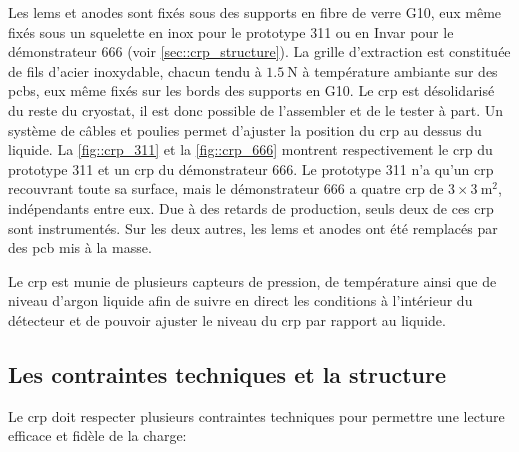             Les \glspl{lem} et anodes sont fixés sous des supports en fibre de verre G10, eux même fixés sous un squelette en inox pour le prototype 311 ou en Invar pour le démonstrateur 666 (voir \autoref{sec::crp_structure}). La grille d'extraction est constituée de fils d'acier inoxydable, chacun tendu à $\SI{1.5}{\newton}$ à température ambiante sur des \glspl{pcb}, eux même fixés sur les bords des supports en G10. Le \gls{crp} est désolidarisé du reste du cryostat, il est donc possible de l'assembler et de le tester à part. Un système de câbles et poulies permet d'ajuster la position du \gls{crp} au dessus du liquide. La \autoref{fig::crp_311} et la \autoref{fig::crp_666} montrent respectivement le \gls{crp} du prototype 311 et un \gls{crp} du démonstrateur 666. Le prototype 311 n'a qu'un \gls{crp} recouvrant toute sa surface, mais le démonstrateur 666 a quatre \gls{crp} de $3\times\SI{3}{\meter\squared}$, indépendants entre eux. Due à des retards de production, seuls deux de ces \gls{crp} sont instrumentés. Sur les deux autres, les \glspl{lem} et anodes ont été remplacés par des \gls{pcb} mis à la masse.
            
            Le \gls{crp} est munie de plusieurs capteurs de pression, de température ainsi que de niveau d'argon liquide afin de suivre en direct les conditions à l'intérieur du détecteur et de pouvoir ajuster le niveau du \gls{crp} par rapport au liquide.
        
        \subsection{Les contraintes techniques et la structure}\label{sec::crp_structure}
            
            Le \gls{crp} doit respecter plusieurs contraintes techniques \cite{talk_crp} pour permettre une lecture efficace et fidèle de la charge:
            
